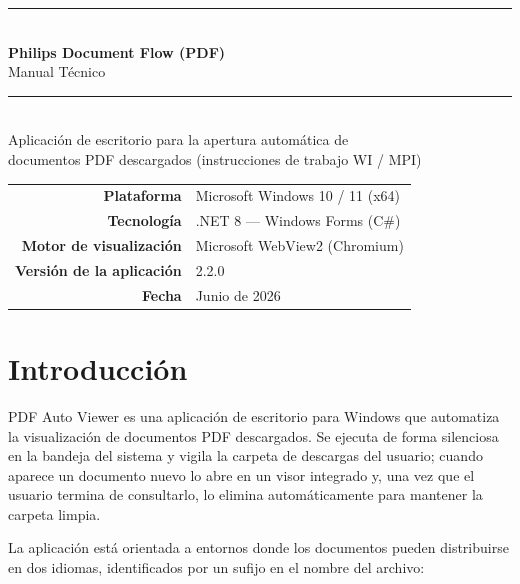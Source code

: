 \documentclass[11pt,a4paper]{article}
\begin{document}
\begin{titlepage}
\centering
\vspace*{3cm}
{\color{black}\rule{\textwidth}{1.2pt}}\\[0.8cm]
{\Huge\bfseries Philips Document Flow (PDF)}\\[0.5cm]
{\LARGE Manual Técnico}\\[0.4cm]
{\color{black}\rule{\textwidth}{1.2pt}}\\[2cm]

{\large Aplicación de escritorio para la apertura automática de\\
documentos PDF descargados (instrucciones de trabajo WI / MPI)}\\[3cm]

\begin{tabular}{@{}r l@{}}
\textbf{Plataforma} & Microsoft Windows 10 / 11 (x64) \\[5pt]
\textbf{Tecnología} & .NET 8 --- Windows Forms (C\#) \\[5pt]
\textbf{Motor de visualización} & Microsoft WebView2 (Chromium) \\[5pt]
\textbf{Versión de la aplicación} & 2.2.0 \\[5pt]
\textbf{Fecha} & Junio de 2026 \\
\end{tabular}

\vfill
\end{titlepage}

\tableofcontents
\newpage

\section{Introducción}
PDF Auto Viewer es una aplicación de escritorio para Windows que automatiza la
visualización de documentos PDF descargados. Se ejecuta de forma silenciosa en
la bandeja del sistema y vigila la carpeta de descargas del usuario; cuando
aparece un documento nuevo lo abre en un visor integrado y, una vez que el
usuario termina de consultarlo, lo elimina automáticamente para mantener la
carpeta limpia.

La aplicación está orientada a entornos donde los documentos pueden distribuirse
en dos idiomas, identificados por un sufijo en el nombre del archivo:
\end{document}
